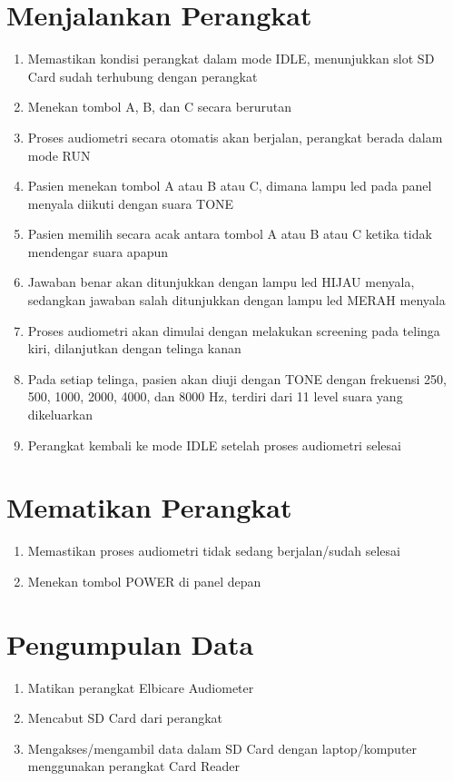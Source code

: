 \documentclass[11pt,a4paper,twoside,draft,onecolumn]{book}
\begin{document}
		\section{Menjalankan Perangkat}
		\begin{enumerate}
			\item Memastikan kondisi perangkat dalam mode IDLE, menunjukkan slot SD Card sudah terhubung dengan perangkat
			\item Menekan tombol A, B, dan C secara berurutan 
			\item Proses audiometri secara otomatis akan berjalan, perangkat berada dalam mode RUN 
			\item Pasien menekan tombol A atau B atau C, dimana lampu led pada panel menyala diikuti dengan suara TONE
			\item Pasien memilih secara acak antara tombol A atau B atau C ketika tidak mendengar suara apapun
			\item Jawaban benar akan ditunjukkan dengan lampu led HIJAU menyala, sedangkan jawaban salah ditunjukkan dengan lampu led MERAH menyala
			\item Proses audiometri akan dimulai dengan melakukan screening pada telinga kiri, dilanjutkan dengan telinga kanan
			\item Pada setiap telinga, pasien akan diuji dengan TONE dengan frekuensi 250, 500, 1000, 2000, 4000, dan 8000 Hz, terdiri dari 11 level suara yang dikeluarkan
			\item Perangkat kembali ke mode IDLE setelah proses audiometri selesai
		\end{enumerate}
		
		\section{Mematikan Perangkat}
		\begin{enumerate}
			\item Memastikan proses audiometri tidak sedang berjalan/sudah selesai
			\item Menekan tombol POWER di panel depan
		\end{enumerate}
	
		\section{Pengumpulan Data}
		\begin{enumerate}
			\item Matikan perangkat Elbicare Audiometer
			\item Mencabut SD Card dari perangkat 
			\item Mengakses/mengambil data dalam SD Card dengan laptop/komputer menggunakan perangkat Card Reader 
		\end{enumerate}
	
\end{document}

